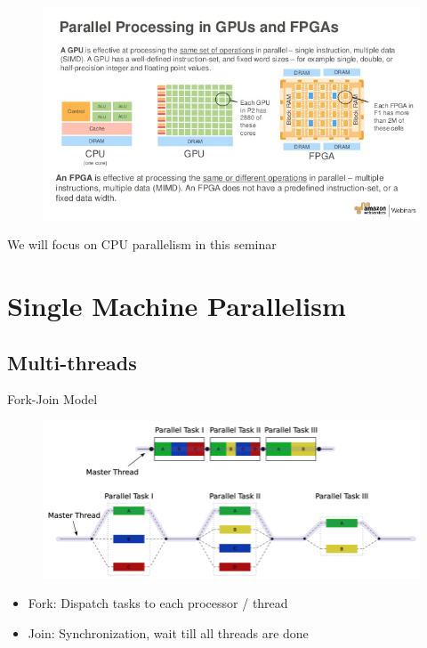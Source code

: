 \documentclass{../TexTemplate/myslide}
\begin{document}
\begin{frame}
\begin{figure}
\centering
\includegraphics[width=\linewidth]{fig/gpu-fpga.jpg}
\end{figure}
\pause
We will focus on CPU parallelism in this seminar
\end{frame}

\section{Single Machine Parallelism}
\begin{frame}
\sectionpage
\end{frame}

\subsection{Multi-threads}
\begin{frame}
\subsectionpage
\end{frame}

\begin{frame}{Fork-Join Model}
\begin{figure}
\centering
\includegraphics[width=\linewidth]{fig/fork-join.png}
\end{figure}
\begin{itemize}
	\item Fork: Dispatch tasks to each processor / thread
	\item Join: Synchronization, wait till all threads are done
\end{itemize}
\end{frame}
\end{document}
